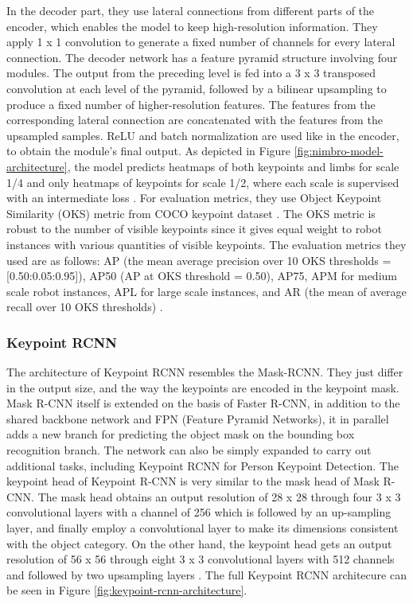 In the decoder part, they use lateral connections from different parts of the encoder, which enables the model to keep high-resolution information. They apply 1 x 1 convolution to generate a fixed number of channels for every lateral connection.
The decoder network has a feature pyramid structure involving four modules. The output from the preceding level is fed into a 3 x 3 transposed convolution at each level of the pyramid, followed by a bilinear upsampling to produce a fixed number of higher-resolution features.
The features from the corresponding lateral connection are concatenated with the features from the upsampled samples. ReLU and batch normalization are used like in the encoder, to obtain the module's final output.
As depicted in Figure \ref{fig:nimbro-model-architecture}, the model predicts heatmaps of both keypoints and limbs for scale 1/4 and only
heatmaps of keypoints for scale 1/2, where each scale is supervised with an intermediate loss \parencite{amini2021}.
For evaluation metrics, they use Object Keypoint Similarity (OKS) metric from COCO keypoint dataset \parencite{ronchi2017}.
The OKS metric is robust to the number of visible keypoints since it gives equal weight to robot instances with various quantities of visible keypoints.
The evaluation metrics they used are as follows: AP (the mean average precision over 10 OKS thresholds = [0.50:0.05:0.95]), AP50
(AP at OKS threshold = 0.50), AP75, APM for medium scale robot instances, APL for large scale instances, and AR (the mean of average recall over 10 OKS thresholds) \parencite{amini2021}.

\subsubsection{Keypoint RCNN}
\label{subsubsec:rcnn}

The architecture of Keypoint RCNN resembles the Mask-RCNN. They just differ in the output size, and the way the keypoints are encoded in the keypoint mask. Mask R-CNN itself is extended on the basis of Faster R-CNN,
in addition to the shared backbone network and FPN (Feature Pyramid Networks), it in parallel adds a new branch for predicting the object mask on the bounding box recognition branch.
The network can also be simply expanded to carry out additional tasks, including Keypoint RCNN for Person Keypoint Detection. The keypoint head of Keypoint R-CNN is very similar to the mask head of Mask R-CNN. The mask head obtains an output resolution of
28 x 28 through four 3 x 3 convolutional layers with a channel of 256 which is followed by an up-sampling layer, and finally
employ a convolutional layer to make its dimensions consistent with the object category. On the other hand, the keypoint head gets an output resolution of 56 x 56 through eight 3 x 3 convolutional
layers with 512 channels and followed by two upsampling layers \parencite{zhang2021}.
The full Keypoint RCNN architecure can be seen in Figure \ref{fig:keypoint-rcnn-architecture}.

